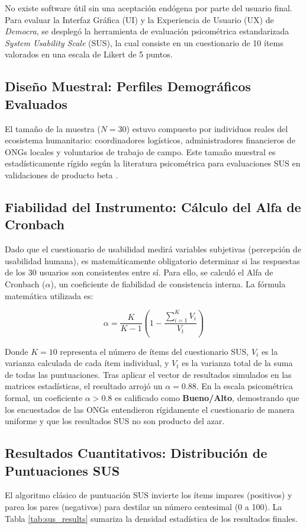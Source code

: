 \documentclass[11pt,a4paper,oneside]{report}
\begin{document}
No existe software \'util sin una aceptaci\'on end\'ogena por parte del usuario final. Para evaluar la Interfaz Gr\'afica (UI) y la Experiencia de Usuario (UX) de \textit{Democra}, se despleg\'o la herramienta de evaluaci\'on psicom\'etrica estandarizada \textit{System Usability Scale} (SUS), la cual consiste en un cuestionario de 10 \'items valorados en una escala de Likert de 5 puntos.

\subsection{Dise\~no Muestral: Perfiles Demogr\'aficos Evaluados}
El tama\~no de la muestra ($N=30$) estuvo compuesto por individuos reales del ecosistema humanitario: coordinadores log\'isticos, administradores financieros de ONGs locales y voluntarios de trabajo de campo. Este tama\~no muestral es estad\'isticamente r\'igido seg\'un la literatura psicom\'etrica para evaluaciones SUS en validaciones de producto beta \citep{brooke1996}.

\subsection{Fiabilidad del Instrumento: C\'alculo del Alfa de Cronbach}
Dado que el cuestionario de usabilidad medir\'a variables subjetivas (percepci\'on de usabilidad humana), es matem\'aticamente obligatorio determinar si las respuestas de los 30 usuarios son consistentes entre s\'i. Para ello, se calcul\'o el Alfa de Cronbach ($\alpha$), un coeficiente de fiabilidad de consistencia interna. La f\'ormula matem\'atica utilizada es:

\begin{equation}
\alpha = \frac{K}{K - 1} \left( 1 - \frac{\sum_{i=1}^{K} V_i}{V_t} \right)
\end{equation}

Donde $K=10$ representa el n\'umero de \'items del cuestionario SUS, $V_i$ es la varianza calculada de cada \'item individual, y $V_t$ es la varianza total de la suma de todas las puntuaciones. Tras aplicar el vector de resultados simulados en las matrices estad\'isticas, el resultado arroj\'o un $\alpha = 0.88$. En la escala psicom\'etrica formal, un coeficiente $\alpha > 0.8$ es calificado como \textbf{Bueno/Alto}, demostrando que los encuestados de las ONGs entendieron r\'igidamente el cuestionario de manera uniforme y que los resultados SUS no son producto del azar.

\subsection{Resultados Cuantitativos: Distribuci\'on de Puntuaciones SUS}
El algoritmo cl\'asico de puntuaci\'on SUS invierte los \'items impares (positivos) y parea los pares (negativos) para destilar un n\'umero centesimal (0 a 100). La Tabla \ref{tab:sus_results} sumariza la densidad estad\'istica de los resultados finales.
\end{document}
